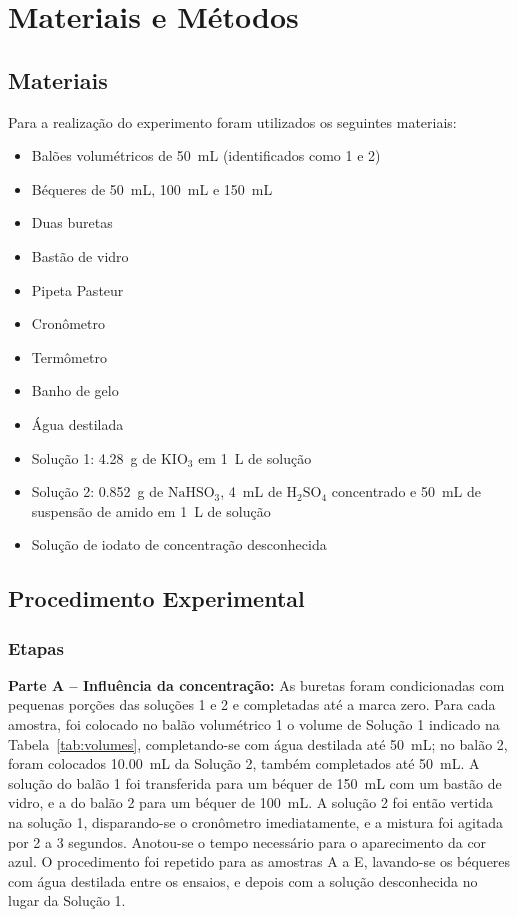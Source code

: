 \section{Materiais e Métodos}
 \subsection{Materiais}
 Para a realização do experimento foram utilizados os seguintes materiais:
 \begin{itemize}
    \item Balões volumétricos de \SI{50}{mL} (identificados como 1 e 2)
    \item Béqueres de \SI{50}{mL}, \SI{100}{mL} e \SI{150}{mL}
    \item Duas buretas
    \item Bastão de vidro
    \item Pipeta Pasteur
    \item Cronômetro
    \item Termômetro
    \item Banho de gelo
    \item Água destilada
    \item Solução 1: \SI{4,28}{g} de $\mathrm{KIO_3}$ em \SI{1}{L} de solução
    \item Solução 2: \SI{0,852}{g} de $\mathrm{NaHSO_3}$, \SI{4}{mL} de $\mathrm{H_2SO_4}$ concentrado e \SI{50}{mL} de suspensão de amido em \SI{1}{L} de solução
    \item Solução de iodato de concentração desconhecida
\end{itemize}

 \subsection{Procedimento Experimental}

 \subsubsection{Etapas}
    \textbf{Parte A -- Influência da concentração:}
    As buretas foram condicionadas com pequenas porções das soluções 1 e 2 e completadas até a marca zero. Para cada amostra, foi colocado no balão volumétrico 1 o volume de Solução 1 indicado na Tabela~\ref{tab:volumes}, completando-se com água destilada até \SI{50}{mL}; no balão 2, foram colocados \SI{10,00}{mL} da Solução 2, também completados até \SI{50}{mL}. A solução do balão 1 foi transferida para um béquer de \SI{150}{mL} com um bastão de vidro, e a do balão 2 para um béquer de \SI{100}{mL}. A solução 2 foi então vertida na solução 1, disparando-se o cronômetro imediatamente, e a mistura foi agitada por 2 a 3 segundos. Anotou-se o tempo necessário para o aparecimento da cor azul. O procedimento foi repetido para as amostras A a E, lavando-se os béqueres com água destilada entre os ensaios, e depois com a solução desconhecida no lugar da Solução 1.


